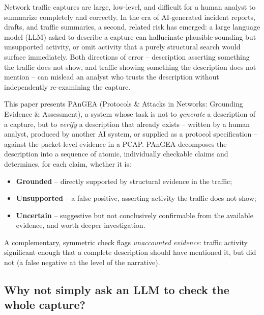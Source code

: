 \documentclass[sigconf,nonacm]{acmart}
\begin{document}
Network traffic captures are large, low-level, and difficult for a human analyst
to summarize completely and correctly. In the era of AI-generated incident
reports, drafts, and traffic summaries, a second, related risk has emerged:
a large language model (LLM) asked to describe a capture can hallucinate
plausible-sounding but unsupported activity, or omit activity that a purely
structural search would surface immediately. Both directions of error --
description asserting something the traffic does not show, and traffic showing
something the description does not mention -- can mislead an analyst who trusts
the description without independently re-examining the capture.

This paper presents PAnGEA (Protocols \& Attacks in Networks: Grounding
Evidence \& Assessment), a system whose task is not to \emph{generate} a
description of a capture, but to \emph{verify} a description that already
exists -- written by a human analyst, produced by another AI system, or
supplied as a protocol specification -- against the packet-level evidence in
a PCAP. PAnGEA decomposes the description into a sequence of atomic,
individually checkable claims and determines, for each claim, whether it is:

\begin{itemize}
  \item \textbf{Grounded} -- directly supported by structural evidence in the traffic;
  \item \textbf{Unsupported} -- a false positive, asserting activity the traffic does not show;
  \item \textbf{Uncertain} -- suggestive but not conclusively confirmable from the available evidence, and worth deeper investigation.
\end{itemize}

A complementary, symmetric check flags \emph{unaccounted evidence}: traffic
activity significant enough that a complete description should have mentioned
it, but did not (a false negative at the level of the narrative).

\subsection{Why not simply ask an LLM to check the whole capture?}
\end{document}
